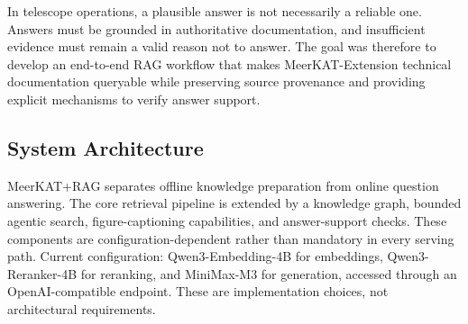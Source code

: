\documentclass[11pt,twoside]{article}
\begin{document}
In telescope operations, a plausible answer is not necessarily a reliable one. Answers must be grounded in authoritative documentation, and insufficient evidence must remain a valid reason not to answer.
The goal was therefore to develop an end-to-end RAG workflow that makes MeerKAT-Extension technical documentation queryable while preserving source provenance and providing explicit mechanisms to verify answer support. 

\subsection{System Architecture}

MeerKAT+RAG separates offline knowledge preparation from online question answering.
The core retrieval pipeline is extended by a knowledge graph, bounded agentic search, figure-captioning capabilities, and answer-support checks.
These components are configuration-dependent rather than mandatory in every serving path.
Current configuration:
Qwen3-Embedding-4B for embeddings, Qwen3-Reranker-4B for reranking, and MiniMax-M3 for generation, accessed through an OpenAI-compatible endpoint.
These are implementation choices, not architectural requirements.
\end{document}
